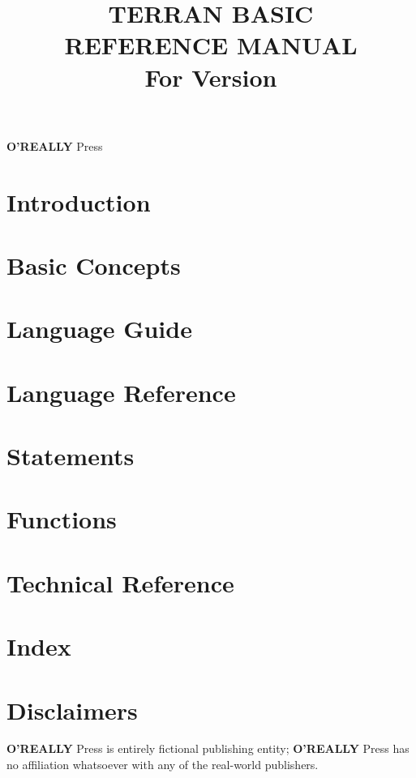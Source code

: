 \documentclass[10pt, stock, openany]{memoir}
\title{\HUGE\textbf{TERRAN BASIC \\ REFERENCE MANUAL} \\ \Large \vspace{1em} For Version \tbasver \\ \vspace{7mm} \theedition}
\date{}
\author{}
\newcommand{\oreallypress}{\large\textbf{O'REALLY\raisebox{1ex}{\scriptsize ?}} \normalsize Press}
\begin{document}
\begin{titlingpage}
\maketitle{}
\vfill
\oreallypress
\end{titlingpage}

\setcounter{page}{3}

\tableofcontents*



\openright
\chapter{Introduction}


\openany
\chapter{Basic Concepts}


\chapter{Language Guide}


\chapter{Language Reference}


\chapter{Statements}


\chapter{Functions}


\chapter{Technical Reference}





\chapter{Index}

\chapter*{Disclaimers}

\oreallypress{} is entirely fictional publishing entity; \oreallypress{} has no affiliation whatsoever with any of the real-world publishers.


\afterpage{\pagestyle{empty}\null\newpage}
\end{document}
